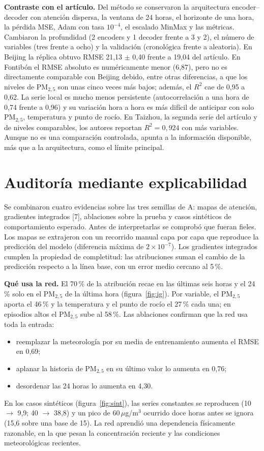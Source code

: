 \documentclass[11pt,letterpaper]{article}
\newcommand{\PM}{PM$_{2,5}$}
\newcommand{\ugm}{\,$\mu$g/m$^3$}
\begin{document}
\textbf{Contraste con el artículo.} Del método se conservaron la arquitectura encoder–decoder con
atención dispersa, la ventana de 24 horas, el horizonte de una hora, la pérdida MSE, Adam con tasa
$10^{-4}$, el escalado MinMax y las métricas. Cambiaron la profundidad (2 encoders y 1 decoder frente a
3 y 2), el número de variables (tres frente a ocho) y la validación (cronológica frente a aleatoria). En
Beijing la réplica obtuvo RMSE 21,13 $\pm$ 0,40 frente a 19,04 del artículo. En Fontibón el RMSE absoluto es numéricamente menor
(6,87), pero no es directamente comparable con Beijing debido, entre otras diferencias, a que los niveles de \PM{} son unas cinco veces más bajos; además, el $R^2$ cae de 0,95 a 0,62. La serie local
es mucho menos persistente (autocorrelación a una hora de 0,74 frente a 0,96) y su variación hora a hora es
más difícil de anticipar con solo \PM, temperatura y punto de rocío. En Taizhou, la segunda serie del
artículo y de niveles comparables, los autores reportan $R^2 = 0{,}924$ con más variables. Aunque no es una
comparación controlada, apunta a la información disponible, más que a la arquitectura, como el límite
principal.

\section{Auditoría mediante explicabilidad}

Se combinaron cuatro evidencias sobre las tres semillas de A: mapas de atención, gradientes integrados
[7], ablaciones sobre la prueba y casos sintéticos de comportamiento esperado. Antes de interpretarlas se
comprobó que fueran fieles. Los mapas se extrajeron con un recorrido manual capa por capa que reproduce la
predicción del modelo (diferencia máxima de $2\times10^{-7}$). Los gradientes integrados cumplen la
propiedad de completitud: las atribuciones suman el cambio de la predicción respecto a la línea base, con
un error medio cercano al 5\,\%.

\textbf{Qué usa la red.} El 70\,\% de la atribución recae en las últimas seis horas y el 24\,\% solo en el
\PM{} de la última hora (figura~\ref{fig:ig}). Por variable, el \PM{} aporta el 46\,\% y la temperatura y
el punto de rocío el 27\,\% cada una; en episodios altos el \PM{} sube al 58\,\%. Las ablaciones confirman
que la red usa toda la entrada:
\begin{itemize}
\item reemplazar la meteorología por su media de entrenamiento aumenta el RMSE en 0,69;
\item aplanar la historia de \PM{} en su último valor lo aumenta en 0,76;
\item desordenar las 24 horas lo aumenta en 4,30.
\end{itemize}
En los casos sintéticos (figura~\ref{fig:sint}), las series constantes se reproducen (10 $\rightarrow$
9,9; 40 $\rightarrow$ 38,8) y un pico de 60\ugm{} ocurrido doce horas antes se ignora (15,6 sobre una base
de 15). La red aprendió una dependencia físicamente razonable, en la que pesan la concentración reciente y
las condiciones meteorológicas recientes.
\end{document}
